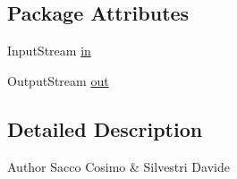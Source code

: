 \subsection*{\-Package \-Attributes}
\begin{DoxyCompactItemize}
\item 
\-Input\-Stream \hyperlink{classit_1_1saccosilvestri_1_1jsp2p_1_1securecommunication_1_1_secure_communication_a007b240b59e1189f3994e735dae50ea5}{in}
\item 
\-Output\-Stream \hyperlink{classit_1_1saccosilvestri_1_1jsp2p_1_1securecommunication_1_1_secure_communication_a35e77cca97b78b630af1d7a4084133ad}{out}
\end{DoxyCompactItemize}


\subsection{\-Detailed \-Description}
\begin{DoxyAuthor}{\-Author}
\-Sacco \-Cosimo \& \-Silvestri \-Davide 
\end{DoxyAuthor}


